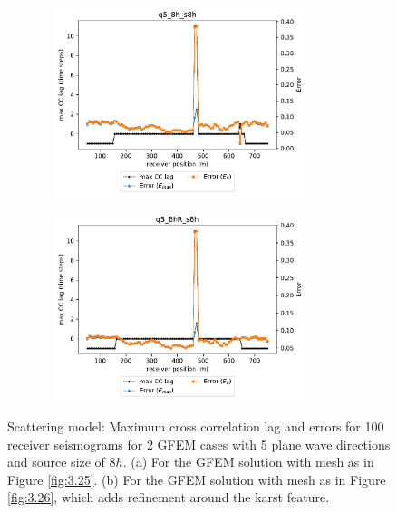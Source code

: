  \begin{figure}[h!]
 		\centering
		\begin{subfigure}{8cm}
				\includegraphics[width=8cm, height=5.5cm]{Thesis_Edith/figures/scattering/scat_waves/Err_q5_8h_s8h.pdf}
			     \caption{}
		\end{subfigure}
        \hspace{0.25cm}	
		\begin{subfigure}{8cm}
				\includegraphics[width=8cm, height=5.5cm]{Thesis_Edith/figures/scattering/scat_waves/Err_q5_8hR_s8h.pdf}
			   \caption{}
		\end{subfigure}
 
	\caption{Scattering model: Maximum cross correlation lag and errors for 100 receiver seismograms for 2 GFEM cases with 5 plane wave directions and source size of $8h$. (a) For the GFEM solution with mesh as in Figure \ref{fig:3.25}. (b) For the GFEM solution with mesh as in Figure \ref{fig:3.26}, which adds refinement around the karst feature.}
	\label{fig:3.33}
\end{figure}

